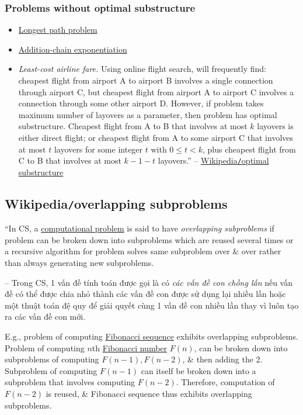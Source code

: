 \documentclass{article}
\begin{document}
\subsubsection{Problems without optimal substructure}

\begin{itemize}
	\item \href{https://en.wikipedia.org/wiki/Longest_path_problem}{Longest path problem}
	\item \href{https://en.wikipedia.org/wiki/Addition-chain_exponentiation}{Addition-chain exponentiation}
	\item {\it Least-cost airline fare.} Using online flight search, will frequently find: cheapest flight from airport A to airport B involves a single connection through airport C, but cheapest flight from airport A to airport C involves a connection through some other airport D. However, if problem takes maximum number of layovers as a parameter, then problem has optimal substructure. Cheapest flight from A to B that involves at most $k$ layovers is either direct flight; or cheapest flight from A to some airport C that involves at most $t$ layovers for some integer $t$ with $0\le t < k$, plus cheapest flight from C to B that involves at most $k - 1 - t$ layovers.'' -- \href{https://en.wikipedia.org/wiki/Optimal_substructure}{Wikipedia{\tt/}optimal substructure}
\end{itemize}


\subsection{Wikipedia{\tt/}overlapping subproblems}
``In CS, a \href{https://en.wikipedia.org/wiki/Computational_problem}{computational problem} is said to have {\it overlapping subproblems} if problem can be broken down into subproblems which are reused several times or a recursive algorithm for problem solves same subproblem over \& over rather than always generating new subproblems.

-- Trong CS, 1 vấn đề tính toán được gọi là có {\it các vấn đề con chồng lấn} nếu vấn đề có thể được chia nhỏ thành các vấn đề con được sử dụng lại nhiều lần hoặc một thuật toán đệ quy để giải quyết cùng 1 vấn đề con nhiều lần thay vì luôn tạo ra các vấn đề con mới.

E.g., problem of computing \href{https://en.wikipedia.org/wiki/Fibonacci_sequence}{Fibonacci sequence} exhibits overlapping subproblems. Problem of computing $n$th \href{https://en.wikipedia.org/wiki/Fibonacci_number}{Fibonacci number} $F(n)$, can be broken down into subproblems of computing $F(n - 1),F(n - 2)$, \& then adding the 2. Subproblem of computing $F(n - 1)$ can itself be broken down into a subproblem that involves computing $F(n - 2)$. Therefore, computation of $F(n - 2)$ is reused, \& Fibonacci sequence thus exhibits overlapping subproblems.
\end{document}
